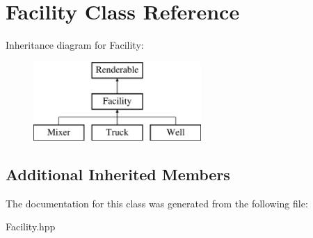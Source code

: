 \hypertarget{class_facility}{}\section{Facility Class Reference}
\label{class_facility}
Inheritance diagram for Facility\+:\begin{figure}[H]
\begin{center}
\leavevmode
\includegraphics[height=3.000000cm]{class_facility}
\end{center}
\end{figure}
\subsection*{Additional Inherited Members}


The documentation for this class was generated from the following file\+:\begin{DoxyCompactItemize}
\item 
Facility.\+hpp\end{DoxyCompactItemize}
